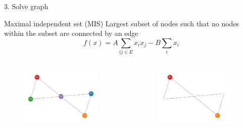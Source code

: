\documentclass[handout]{beamer}
\begin{document}
\begin{frame}{3. Solve graph}
    \begin{alertblock}{Maximal independent set (MIS)}
        \vspace{0.1em}
        Largest subset of nodes such that no nodes within the subset are connected by an edge
        \begin{equation*}
            f(x)=A\sum_{ij\in E}x_ix_j-B\sum_i x_i
        \end{equation*}
        \hfill\cite{lucas_ising_2014}
    \end{alertblock}
    \pause
    \begin{columns}
        \begin{column}{0.5\textwidth}
            \begin{figure}
                \includegraphics[width=0.9\textwidth]{../Figures/toy_graph.pdf}
            \end{figure}
        \end{column}
        \begin{column}{0.5\textwidth}
            \begin{figure}
                \includegraphics[width=0.9\textwidth]{../Figures/toy_solution.pdf}
            \end{figure}
        \end{column}
    \end{columns}
\end{frame}
\end{document}
